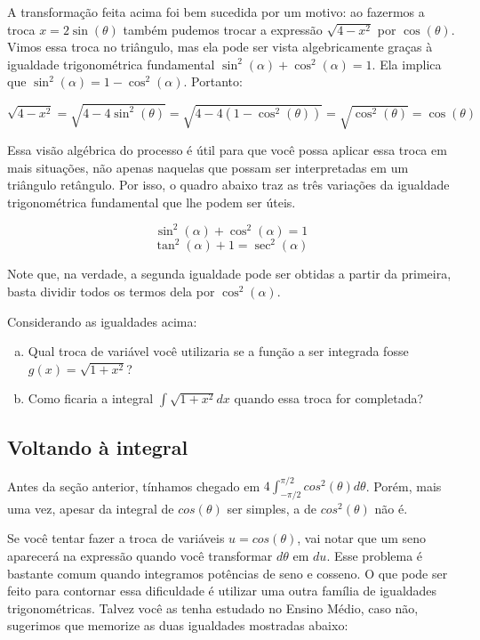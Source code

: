 \documentclass[main_estudante.tex]{subfiles}
\begin{document}
A transformação feita acima foi bem sucedida por um motivo: ao fazermos a troca $x=2\sin(\theta)$ também pudemos trocar a expressão $\sqrt{4-x^2}$ por $\cos(\theta)$. Vimos essa troca no triângulo, mas ela pode ser vista algebricamente graças à igualdade trigonométrica fundamental $\sin^2(\alpha) + \cos^2(\alpha)=1$. Ela implica que $\sin^2(\alpha)=1-\cos^2(\alpha)$. Portanto:

$$\sqrt{4-x^2} = \sqrt{4-4\sin^2(\theta)} = \sqrt{4-4(1-\cos^2(\theta))} = \sqrt{\cos^2(\theta)} = \cos(\theta)$$

Essa visão algébrica do processo é útil para que você possa aplicar essa troca em mais situações, não apenas naquelas que possam ser interpretadas em um triângulo retângulo. Por isso, o quadro abaixo traz as três variações da igualdade trigonométrica fundamental que lhe podem ser úteis.

\begin{shaded*}
$$\sin^2(\alpha) + \cos^2(\alpha)=1$$
$$\tan^2(\alpha) + 1= \sec^2(\alpha)$$
\end{shaded*}

Note que, na verdade, a segunda igualdade pode ser obtidas a partir da primeira, basta dividir todos os termos dela por $\cos^2(\alpha)$.

\begin{questao}
Considerando as igualdades acima:
\begin{enumerate}[a)]
\item Qual troca de variável você utilizaria se a função a ser integrada fosse $g(x)=\sqrt{1+x^2}$?
\item Como ficaria a integral $\int \sqrt{1+x^2} dx$ quando essa troca for completada?
\end{enumerate}
\end{questao}

\subsection*{Voltando à integral}

Antes da seção anterior, tínhamos chegado em $4\int_{-\pi/2}^{\pi/2} cos^2(\theta)d\theta$. Porém, mais uma vez, apesar da integral de $cos(\theta)$ ser simples, a de $cos^2(\theta)$ não é.

Se você tentar fazer a troca de variáveis $u=cos(\theta)$, vai notar que um seno aparecerá na expressão quando você transformar $d\theta$ em $du$. Esse problema é bastante comum quando integramos potências de seno e cosseno. O que pode ser feito para contornar essa dificuldade é utilizar uma outra família de igualdades trigonométricas. Talvez você as tenha estudado no Ensino Médio, caso não, sugerimos que memorize as duas igualdades mostradas abaixo:
\end{document}
